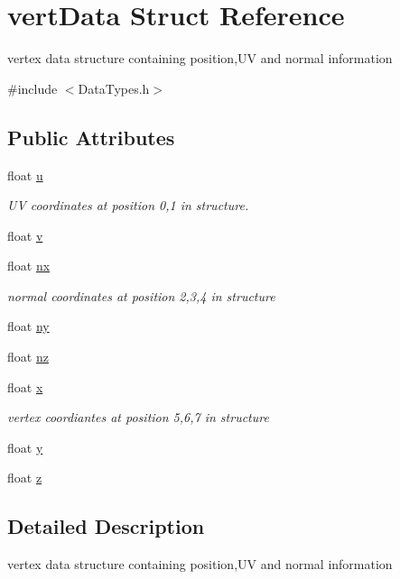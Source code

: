 \hypertarget{structvert_data}{\section{vert\-Data Struct Reference}
\label{structvert_data}
}


vertex data structure containing position,U\-V and normal information  




{\ttfamily \#include $<$Data\-Types.\-h$>$}

\subsection*{Public Attributes}
\begin{DoxyCompactItemize}
\item 
float \hyperlink{structvert_data_a2105cbd897b53fc784a8a18b2666176e}{u}
\begin{DoxyCompactList}\small\item\em U\-V coordinates at position 0,1 in structure. \end{DoxyCompactList}\item 
float \hyperlink{structvert_data_a7db60ebd2dc77380d7ca9a95758a1610}{v}
\item 
float \hyperlink{structvert_data_a07ad8d8942e0d1bc0e7da9fedf6d7743}{nx}
\begin{DoxyCompactList}\small\item\em normal coordinates at position 2,3,4 in structure \end{DoxyCompactList}\item 
float \hyperlink{structvert_data_a3ef24b3c72da692c44ecfd4a35311e3b}{ny}
\item 
float \hyperlink{structvert_data_a05857ec55116d094517557a8ea4a64b1}{nz}
\item 
float \hyperlink{structvert_data_ac5543195adeb4d007bc053b7a58cf9f6}{x}
\begin{DoxyCompactList}\small\item\em vertex coordiantes at position 5,6,7 in structure \end{DoxyCompactList}\item 
float \hyperlink{structvert_data_a236ce70a3ff07221161c89fe68ec00ae}{y}
\item 
float \hyperlink{structvert_data_a169a9a3ba4dae44a7b9a5ea62041a3fe}{z}
\end{DoxyCompactItemize}


\subsection{Detailed Description}
vertex data structure containing position,U\-V and normal information 

